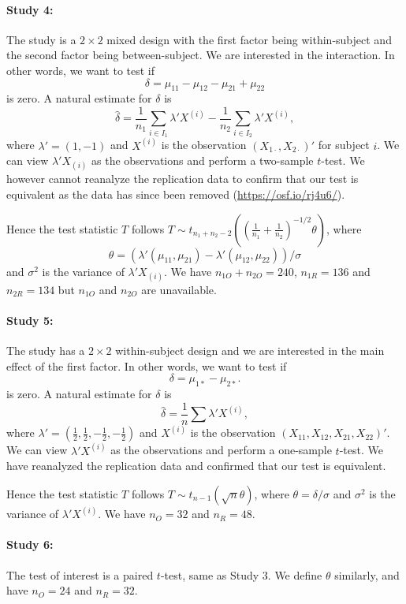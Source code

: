 \documentclass[11pt]{article}
\theoremstyle{definition}
\theoremstyle{custom}
\newcommand{\hdelta}{\hat{\delta}}
\begin{document}
  \paragraph{Study 4: \citet{Storm:2008bt}}
  The study is a $2 \times 2$ mixed design with the first factor being within-subject and the second factor being between-subject. We are interested in the interaction. In other words, we want to test if
  \[
  \delta = \mu_{11} - \mu_{12} - \mu_{21} + \mu_{22}
  \]
  is zero. A natural estimate for $\delta$ is
  \[
  \hdelta = \frac{1}{n_1} \sum_{i \in I_1} \lambda' X^{(i)} - \frac{1}{n_2} \sum_{i \in I_2} \lambda' X^{(i)},
  \]
  where $\lambda' = (1, -1)$ and $X^{(i)}$ is the observation $(X_{1 \cdot}, X_{2 \cdot})'$ for subject $i$. We can view $\lambda' X_{(i)}$ as the observations and perform a two-sample $t$-test. We however cannot reanalyze the replication data to confirm that our test is equivalent as the data has since been removed (\url{https://osf.io/rj4u6/}).

  Hence the test statistic $T$ follows $T \sim t_{n_1 + n_2 - 2}\left(\left(\frac{1}{n_1} + \frac{1}{n_2}\right)^{-1/2} \theta\right)$, where
  \[
  \theta = \left(\lambda'(\mu_{11}, \mu_{21}) - \lambda'(\mu_{12}, \mu_{22})\right) / \sigma
  \]
  and $\sigma^2$ is the variance of $\lambda' X_{(i)}$. We have $n_{1O} + n_{2O} = 240$, $n_{1R} = 136$ and $n_{2R} = 134$ but $n_{1O}$ and $n_{2O}$ are unavailable.

  \paragraph{Study 5: \citet{Mitchell:2008hu}}
  The study has a $2 \times 2$ within-subject design and we are interested in the main effect of the first factor. In other words, we want to test if
  \[
  \delta = \mu_{1*} - \mu_{2*}.
  \]
  is zero. A natural estimate for $\delta$ is
  \[
  \hdelta = \frac{1}{n} \sum \lambda' X^{(i)},
  \]
  where $\lambda' = (\frac{1}{2}, \frac{1}{2}, -\frac{1}{2}, -\frac{1}{2})$ and $X^{(i)}$ is the observation $(X_{11}, X_{12}, X_{21}, X_{22})'$. We can view $\lambda' X^{(i)}$ as the observations and perform a one-sample $t$-test. We have reanalyzed the replication data and confirmed that our test is equivalent.

  Hence the test statistic $T$ follows $T \sim t_{n-1}(\sqrt{n} \theta)$, where $\theta = \delta / \sigma$ and $\sigma^2$ is the variance of $\lambda' X^{(i)}$. We have $n_O = 32$ and $n_R = 48$.

  \paragraph{Study 6: \citet{Berry:2008jh}}
  The test of interest is a paired $t$-test, same as Study 3. We define $\theta$ similarly, and have $n_O = 24$ and $n_R = 32$.
\end{document}
